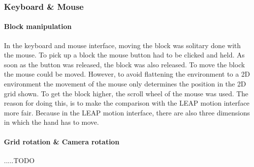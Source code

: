 \subsubsection{Keyboard \& Mouse}

\paragraph{Block manipulation}
In the keyboard and mouse interface, moving the block was solitary done with the mouse. To pick up a block the mouse button had to be clicked and held. As soon as the button was  released, the block was also released. To move the block the mouse could be moved. However, to avoid flattening the environment to a 2D environment the movement of the mouse only determines the position in the 2D grid shown. To get the block higher, the scroll wheel of the mouse was used. The reason for doing this, is to make the comparison with the LEAP motion interface more fair. Because in the LEAP motion interface, there are also three dimensions in which the hand has to move.


\paragraph{Grid rotation \& Camera rotation}
.....TODO